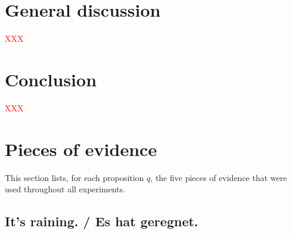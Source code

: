 \documentclass[11pt]{article}
\newcommand{\red}[1]{\textcolor{Red}{#1}}
\begin{document}
\section{General discussion}

\red{XXX}


%
%
%

\section{Conclusion}

\red{XXX}

\appendix

\section{Pieces of evidence}
\label{sec:evidence}

This section lists, for each proposition $q$, the five pieces of evidence that were used throughout all experiments.

\subsection{It's raining. / Es hat geregnet.}
\end{document}
